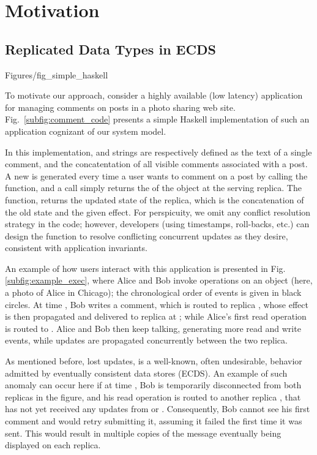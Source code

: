 \section{Motivation}
\label {sec:motiv}
\subsection{Replicated Data Types in ECDS }
 {Figures/fig_simple_haskell}

To motivate our approach, consider a highly available (low
latency) application for managing comments on posts in 
a photo sharing web site.  Fig.~\ref{subfig:comment_code}
presents a simple Haskell implementation of such an application
cognizant of our system model.  

In this implementation, \effectC{} and \stateC{} strings are
respectively defined as the text of a single comment, and the
concatentation of all visible comments associated with a post.  A new
\effectC{} is generated every time a user wants to comment on a post
by calling the \writeC{} function, and a \readC{} call simply returns
the \stateC{} of the object at the serving replica.  The \applyC{}
function, returns the updated state of the replica, which is the
concatenation of the old state and the given effect.  For perspicuity,
we omit any conflict resolution strategy in the code; however,
developers (using timestamps, roll-backs, etc.) can design the
\applyC{} function to resolve conflicting concurrent updates as they
desire, consistent with application invariants.

An example of how users interact with this application is presented in
Fig.\ref{subfig:example_exec}, where Alice and Bob invoke operations
on an object (here, a photo of Alice in Chicago); the chronological
order of events is given in black circles.  At time , Bob
writes a comment, which is routed to replica , whose effect
is then propagated and delivered to replica  at ;
while Alice's first read operation is routed to .  Alice and
Bob then keep talking, generating more read and write events, while
updates are propagated concurrently between the two replica.

As mentioned before, lost updates, is a well-known, often undesirable,
behavior admitted by eventually consistent data stores (ECDS).  An
example of such anomaly can occur here if at time , Bob is
temporarily disconnected from both replicas in the figure, and his
read operation is routed to another replica , that has not
yet received any updates from  or . Consequently,
Bob cannot see his first comment and would retry submitting it,
assuming it failed the first time it was sent.  This would result in
multiple copies of the message eventually being displayed on each
replica.


